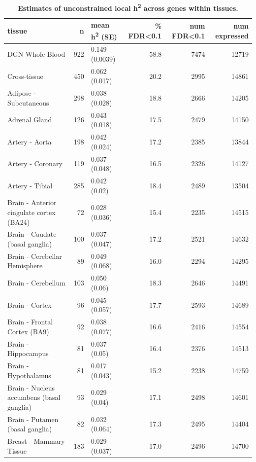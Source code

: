 \documentclass[10pt,letterpaper]{article}
\begin{document}
\begin{table}[!ht]
\begin{adjustwidth}{-2.25in}{0in} %
\caption{
{\bf Estimates of unconstrained local h\textsuperscript{2} across genes within tissues.}}
\begin{tabular}{lrlrrr}
 \hline
tissue & n & mean h\textsuperscript{2} (SE) & \% FDR\textless{}0.1 & num FDR\textless{}0.1 & num expressed \\ 
  \hline
DGN Whole Blood & 922 & 0.149 (0.0039) & 58.8 & 7474 & 12719 \\ 
  Cross-tissue & 450 & 0.062 (0.017) & 20.2 & 2995 & 14861 \\ 
  Adipose - Subcutaneous & 298 & 0.038 (0.028) & 18.8 & 2666 & 14205 \\ 
  Adrenal Gland & 126 & 0.043 (0.018) & 17.5 & 2479 & 14150 \\ 
  Artery - Aorta & 198 & 0.042 (0.024) & 17.2 & 2385 & 13844 \\ 
  Artery - Coronary & 119 & 0.037 (0.048) & 16.5 & 2326 & 14127 \\ 
  Artery - Tibial & 285 & 0.042 (0.02) & 18.4 & 2489 & 13504 \\ 
  Brain - Anterior cingulate cortex (BA24) & 72 & 0.028 (0.036) & 15.4 & 2235 & 14515 \\ 
  Brain - Caudate (basal ganglia) & 100 & 0.037 (0.047) & 17.2 & 2521 & 14632 \\ 
  Brain - Cerebellar Hemisphere & 89 & 0.049 (0.068) & 16.0 & 2294 & 14295 \\ 
  Brain - Cerebellum & 103 & 0.050 (0.06) & 18.3 & 2646 & 14491 \\ 
  Brain - Cortex & 96 & 0.045 (0.057) & 17.7 & 2593 & 14689 \\ 
  Brain - Frontal Cortex (BA9) & 92 & 0.038 (0.077) & 16.6 & 2416 & 14554 \\ 
  Brain - Hippocampus & 81 & 0.037 (0.05) & 16.4 & 2376 & 14513 \\ 
  Brain - Hypothalamus & 81 & 0.017 (0.043) & 15.2 & 2238 & 14759 \\ 
  Brain - Nucleus accumbens (basal ganglia) & 93 & 0.029 (0.04) & 17.1 & 2498 & 14601 \\ 
  Brain - Putamen (basal ganglia) & 82 & 0.032 (0.064) & 17.3 & 2495 & 14404 \\ 
  Breast - Mammary Tissue & 183 & 0.029 (0.037) & 17.0 & 2496 & 14700 \\ 

\end{tabular}
\end{adjustwidth}
\end{table}
\end{document}
